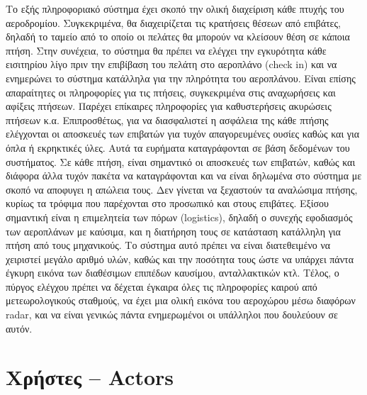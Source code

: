 \documentclass[12pt]{article}
\begin{document}
Το εξής πληροφοριακό σύστημα έχει σκοπό την ολική διαχείριση κάθε πτυχής του
αεροδρομίου. Συγκεκριμένα, θα διαχειρίζεται τις κρατήσεις θέσεων από επιβάτες,
δηλαδή το ταμείο από το οποίο οι πελάτες θα μπορούν να κλείσουν θέση σε κάποια
πτήση. Στην συνέχεια, το σύστημα θα πρέπει να ελέγχει την εγκυρότητα κάθε
εισιτηρίου λίγο πριν την επιβίβαση του πελάτη στο αεροπλάνο (check in) και να
ενημερώνει το σύστημα κατάλληλα για την πληρότητα του αεροπλάνου. Είναι επίσης
απαραίτητες οι πληροφορίες για τις πτήσεις, συγκεκριμένα στις αναχωρήσεις και
αφίξεις πτήσεων. Παρέχει επίκαιρες πληροφορίες για καθυστερήσεις ακυρώσεις
πτήσεων κ.α. Επιπροσθέτως, για να διασφαλιστεί η ασφάλεια της κάθε πτήσης
ελέγχονται οι αποσκευές των επιβατών για τυχόν απαγορευμένες ουσίες καθώς και
για όπλα ή εκρηκτικές ύλες. Αυτά τα ευρήματα καταγράφονται σε βάση δεδομένων
του συστήματος. Σε κάθε πτήση, είναι σημαντικό οι αποσκευές των επιβατών, καθώς
και διάφορα άλλα τυχόν πακέτα να καταγράφονται και να είναι δηλωμένα στο
σύστημα με σκοπό να αποφυγει η απώλεια τους. Δεν γίνεται να ξεχαστούν τα
αναλώσιμα πτήσης, κυρίως τα τρόφιμα που παρέχονται στο προσωπικό και στους
επιβάτες. Εξίσου σημαντική είναι η επιμελητεία των πόρων (logistics), δηλαδή ο
συνεχής εφοδιασμός των αεροπλάνων με καύσιμα, και η διατήρηση τους σε κατάσταση
κατάλληλη για πτήση από τους μηχανικούς. Το σύστημα αυτό πρέπει να είναι
διατεθειμένο να χειριστεί μεγάλο αριθμό υλών, καθώς και την ποσότητα τους ώστε
να υπάρχει πάντα έγκυρη εικόνα των διαθέσιμων επιπέδων καυσίμου, ανταλλακτικών
κτλ. Τέλος, ο πύργος ελέγχου πρέπει να δέχεται έγκαιρα όλες τις πληροφορίες
καιρού από μετεωρολογικούς σταθμούς, να έχει μια ολική εικόνα του αεροχώρου
μέσω διαφόρων radar, και να είναι γενικώς πάντα ενημερωμένοι οι υπάλληλοι που
δουλεύουν σε αυτόν.

\section{Χρήστες -- Actors}
\end{document}
